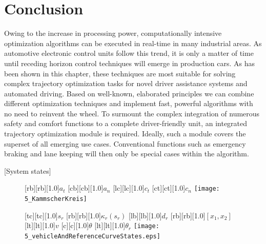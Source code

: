 \section{Conclusion}\label{S:57.6}
Owing to the increase in processing power, computationally intensive optimization algorithms can be executed in real-time in many industrial areas. As automotive electronic control units follow this trend, it is only a matter of time until receding horizon control techniques will emerge in production cars. As has been shown in this chapter, these techniques are most suitable for solving complex trajectory optimization tasks for novel driver assistance systems and automated driving. Based on well-known, elaborated principles we can combine different optimization techniques and implement fast, powerful algorithms with no need to reinvent the wheel.
To surmount the complex integration of numerous safety and comfort functions to a complete driver-friendly unit, an integrated trajectory optimization module is required. Ideally, such a module covers the superset of all emerging use cases. Conventional functions such as emergency braking and lane keeping will then only be special cases within the algorithm.




%

 \hspace{1.8cm} [System states]
\begin{figure}[h]%
\centering
\begin{minipage}{0.45\textwidth}%
    [rb][rb][1.0]{$a_t$}
    [cb][cb][1.0]{$a_n$}
    [lc][lc][1.0]{$c_t$}
    [ct][ct][1.0]{$c_n$}
    \texttt{[image: 5\_KammscherKreis]}
    \label{fig:kammscherKreis}
\end{minipage}
\qquad
\begin{minipage}{0.45\textwidth}%
[tc][tc][1.0]{$s_r$}
    [rb][rb][1.0]{$\kappa_r(s_r)$}
    [lb][lb][1.0]{$d_r$}
    [rb][rb][1.0]{$[x_1, x_2]$}
    [lt][lt][1.0]{$v$}
    [c][c][1.0]{$\theta$}
    [lt][lt][1.0]{$\theta_r$}
    \texttt{[image: 5\_vehicleAndReferenceCurveStates.eps]}
    \label{fig:systemStates}
\end{minipage}%
\end{figure}%


